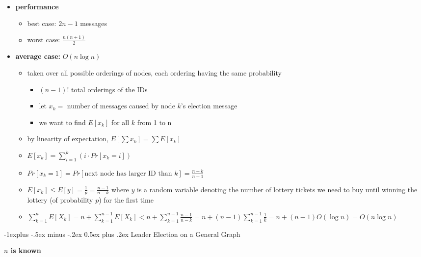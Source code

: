 \documentclass[10pt, landscape]{article}
\makeatletter
\renewcommand{\subsection}{\@startsection{subsection}{2}{0mm}%
  {-1explus -.5ex minus -.2ex}%
  {0.5ex plus .2ex}%
{\normalfont\normalsize\bfseries}}
\makeatother
\begin{document}
\begin{multicols*}{3}
  \begin{itemize}
    \item \textbf{performance}
      \begin{itemize}
        \item best case: $2n-1$ messages
        \item worst case: $\frac{n(n+1)}{2}$
      \end{itemize}
    \item \textbf{average case:} $O(n\log n)$
      \begin{itemize}
        \item taken over all possible orderings of nodes, each ordering having the same probability
          \begin{itemize}
            \item $(n-1)!$  total orderings of the IDs
            \item let $x_k=$ number of messages caused by node $k$'s election message
            \item we want to find $E[x_k]$ for all $k$ from 1 to n
          \end{itemize}
        \item by linearity of expectation, $E[\sum x_k] = \sum E[x_k]$
        \item $E[x_k] = \sum^k_{i=1}(i \cdot Pr[x_k=i])$
        \item $Pr[x_k=1] = Pr[\text{next node has larger ID than }k] = \frac{n-k}{n-1}$
        \item  $E[x_k] \leq E[y] = \frac{1}{p} = \frac{n-1}{n-k}$  where $y$ is a random variable denoting the number of lottery tickets we need to buy until winning the lottery (of probability $p$) for the first time
        \item $\sum^n_{k=1}E[X_k] = n + \sum^{n-1}_{k=1}E[X_k] < n +  \sum ^{n-1}_{k=1}\frac{n-1}{n-k} = n + (n-1) \sum^{n-1}_{k=1} \frac{1}{k} = n + (n-1)O(\log n) = O(n\log n)$
      \end{itemize}
  \end{itemize}

  \subsection{Leader Election on a General Graph}

  \textbf{$n$ is known}


\end{multicols*}
\end{document}
